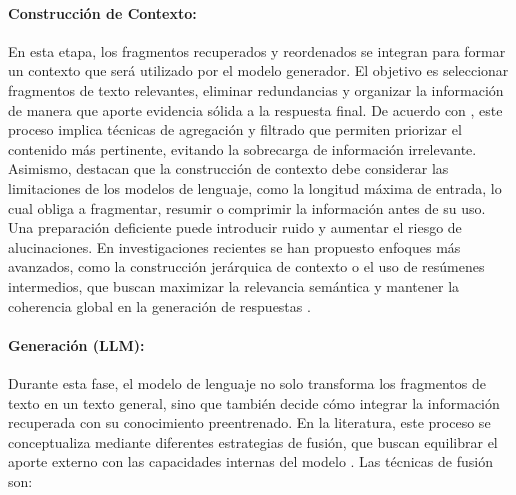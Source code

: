 \paragraph{Construcción de Contexto:} 
En esta etapa, los fragmentos recuperados y reordenados se integran para formar un contexto que será utilizado por el modelo generador. El objetivo es seleccionar 
fragmentos de texto relevantes, eliminar redundancias y organizar la información de manera que aporte evidencia sólida a la respuesta final. De acuerdo con 
\textcite{sarthi2024raptor}, este proceso implica técnicas de agregación y filtrado que permiten priorizar el contenido más pertinente, evitando 
la sobrecarga de información irrelevante. Asimismo, \textcite{gao2023rag} destacan que la construcción de contexto debe considerar las limitaciones de los modelos 
de lenguaje, como la longitud máxima de entrada, lo cual obliga a fragmentar, resumir o comprimir la información antes de su uso. Una preparación deficiente puede introducir ruido y
aumentar el riesgo de alucinaciones.  
En investigaciones recientes se han propuesto enfoques más avanzados, como la construcción jerárquica de contexto o el uso de resúmenes intermedios, que 
buscan maximizar la relevancia semántica y mantener la coherencia global en la generación de respuestas \parencite{hambarde2023ir}.

\paragraph{Generación (LLM):} Durante esta fase, el modelo de lenguaje no solo transforma los fragmentos de texto en un texto general, sino que también decide cómo integrar la información 
recuperada con su conocimiento preentrenado. En la literatura, este proceso se conceptualiza mediante diferentes estrategias de fusión, que buscan equilibrar el aporte
externo con las capacidades internas del modelo \parencite{zhao2024rag,hambarde2023ir}. Las técnicas de fusión son:  

